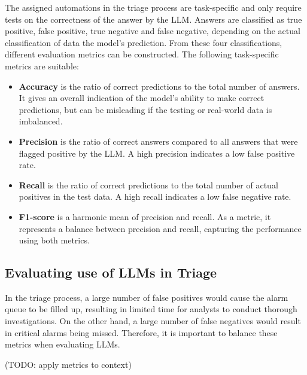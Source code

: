 The assigned automations in the triage process are task-specific and only require tests on the correctness of the answer
by the LLM\@.
Answers are classified as true positive, false positive, true negative and false negative, depending on the actual
classification of data the model's prediction.
From these four classifications, different evaluation metrics can be constructed.
The following task-specific metrics are suitable:
\begin{itemize}
    \item \textbf{Accuracy} is the ratio of correct predictions to the total number of answers.
    It gives an overall indication of the model's ability to make correct predictions, but can be misleading if the
    testing or real-world data is imbalanced.
    \item \textbf{Precision} is the ratio of correct answers compared to all answers that were flagged positive by the
    LLM\@.
    A high precision indicates a low false positive rate.
    \item \textbf{Recall} is the ratio of correct predictions to the total number of actual positives in the test data.
    A high recall indicates a low false negative rate.
    \item \textbf{F1-score} is a harmonic mean of precision and recall.
    As a metric, it represents a balance between precision and recall, capturing the performance using both metrics.
\end{itemize}

\subsection{Evaluating use of LLMs in Triage}
\label{subsec:rq2-evaluating-triage}

In the triage process, a large number of false positives would cause the alarm queue to be filled up, resulting in
limited time for analysts to conduct thorough investigations.
On the other hand, a large number of false negatives would result in critical alarms being missed.
Therefore, it is important to balance these metrics when evaluating LLMs.

(TODO: apply metrics to context) %